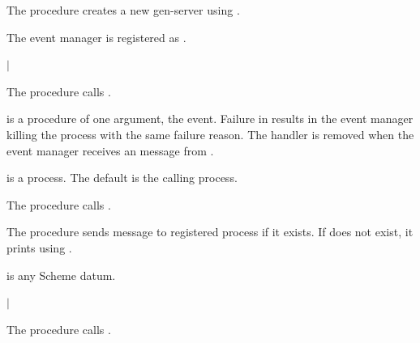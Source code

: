 The  procedure creates a new
 gen-server using .

The event manager is registered as .

\begin{procedure}
\end{procedure}
\returns{}  $|$ 

The  procedure calls
.

 is a procedure of one argument, the event. Failure in
 results in the event manager killing the 
process with the same failure reason. The handler is removed when the
event manager receives an  message from .

 is a process. The default is the calling process.

\begin{procedure}
\end{procedure}
\returns{} 

The  procedure calls
.

\begin{procedure}
\end{procedure}
\returns{} 

The  procedure sends message
 to registered process
 if it exists. If  does not exist,
it prints  using
.

 is any Scheme datum.

\begin{procedure}
\end{procedure}
\returns{}  $|$ 

The  procedure calls
.

